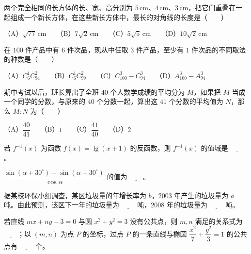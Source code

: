 \begin{question}
两个完全相同的长方体的长、宽、高分别为 $5\,\text{cm}$、$4\,\text{cm}$、$3\,\text{cm}$，把它们重叠在一起组成一个新长方体，在这些新长方体中，最长的对角线的长度是\mbox{（　　）}

（A）$\sqrt{77}\,\text{cm}$　　（B）$7\sqrt2\,\text{cm}$　　（C）$5\sqrt5\,\text{cm}$　　（D）$10\sqrt2\,\text{cm}$

\end{question}
\begin{question}
在 $100$ 件产品中有 $6$ 件次品，现从中任取 $3$ 件产品，至少有 $1$ 件次品的不同取法的种数是\mbox{（　　）}

（A）$C_6^1C_{94}^2$　　（B）$C_6^1C_{99}^2$　　（C）$C_{100}^3-C_{94}^3$　　（D）$A_{100}^3-A_{94}^3$

\end{question}
\begin{question}
期中考试以后，班长算出了全班 $40$ 个人数学成绩的平均分为 $M$，如果把 $M$ 当成一个同学的分数，与原来的 $40$ 个分数一起，算出这 $41$ 个分数的平均值为 $N$，那么 $M:N$ 为\mbox{（　　）}

（A）$\dfrac{40}{41}$　　（B）$1$　　（C）$\dfrac{41}{40}$　　（D）$2$

\end{question}

\begin{question}
若 $f^{-1}(x)$ 为函数 $f(x)=\lg(x+1)$ 的反函数，则 $f^{-1}(x)$ 的值域是 $\underline{\qquad}$。

\end{question}
\begin{question}
$\dfrac{\sin(\alpha+30^\circ)-\sin(\alpha-30^\circ)}{\cos\alpha}$ 的值为 $\underline{\qquad}$。

\end{question}
\begin{question}
据某校环保小组调查，某区垃圾量的年增长率为 $b$，$2003$ 年产生的垃圾量为 $a$ 吨。由此预测，该区下一年的垃圾量为 $\underline{\qquad}$ 吨，$2008$ 年的垃圾量为 $\underline{\qquad}$ 吨。

\end{question}
\begin{question}
若直线 $mx+ny-3=0$ 与圆 $x^2+y^2=3$ 没有公共点，则 $m,n$ 满足的关系式为 $\underline{\qquad}$；以 $(m,n)$ 为点 $P$ 的坐标，过点 $P$ 的一条直线与椭圆 $\dfrac{x^2}{7}+\dfrac{y^2}{3}=1$ 的公共点有 $\underline{\qquad}$ 个。

\end{question}


